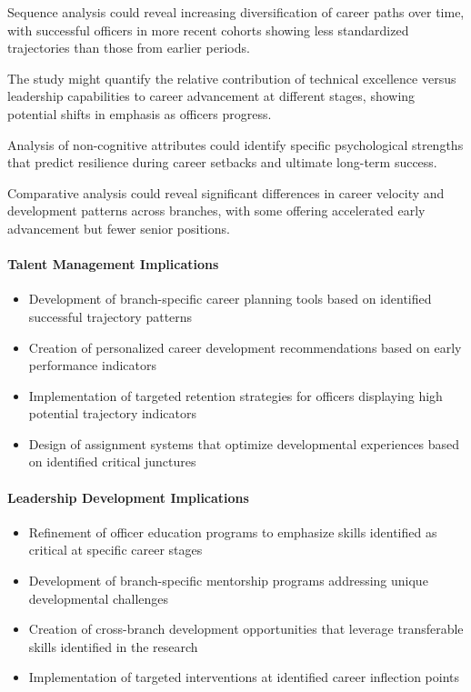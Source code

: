 \documentclass[../main.tex]{subfiles}
\begin{document}
Sequence analysis could reveal increasing diversification of career paths over time, with successful officers in more recent cohorts showing less standardized trajectories than those from earlier periods.

The study might quantify the relative contribution of technical excellence versus leadership capabilities to career advancement at different stages, showing potential shifts in emphasis as officers progress.

Analysis of non-cognitive attributes could identify specific psychological strengths that predict resilience during career setbacks and ultimate long-term success.

Comparative analysis could reveal significant differences in career velocity and development patterns across branches, with some offering accelerated early advancement but fewer senior positions.


\paragraph{Talent Management Implications}
\begin{itemize}
\item Development of branch-specific career planning tools based on identified successful trajectory patterns
\item Creation of personalized career development recommendations based on early performance indicators
\item Implementation of targeted retention strategies for officers displaying high potential trajectory indicators
\item Design of assignment systems that optimize developmental experiences based on identified critical junctures
\end{itemize}

\paragraph{Leadership Development Implications}
\begin{itemize}
\item Refinement of officer education programs to emphasize skills identified as critical at specific career stages
\item Development of branch-specific mentorship programs addressing unique developmental challenges
\item Creation of cross-branch development opportunities that leverage transferable skills identified in the research
\item Implementation of targeted interventions at identified career inflection points
\end{itemize}
\end{document}
